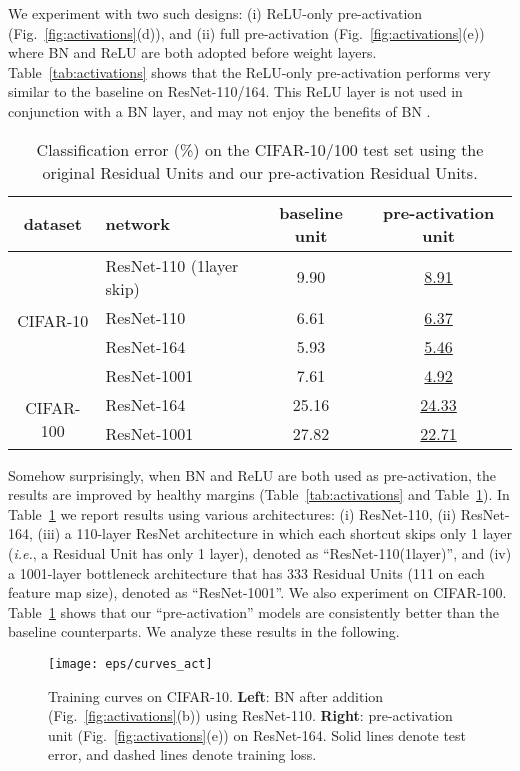 \documentclass[runningheads]{llncs}
\def\ie{\emph{i.e.}}
\begin{document}
We experiment with two such designs: (i) ReLU-only pre-activation (Fig.~\ref{fig:activations}(d)), and (ii) full pre-activation (Fig.~\ref{fig:activations}(e)) where BN and ReLU are both adopted before weight layers. Table~\ref{tab:activations} shows that the ReLU-only pre-activation performs very similar to the baseline on ResNet-110/164. This ReLU layer is not used in conjunction with a BN layer, and may not enjoy the benefits of BN \cite{Ioffe2015}.


\renewcommand\arraystretch{1.3}
\setlength{\tabcolsep}{4pt}
\begin{table}[t]
\caption{Classification error (\%) on the CIFAR-10/100 test set using the original Residual Units and our pre-activation Residual Units.}\label{tab:preact}
\centering
\fontsize{8pt}{1em}\selectfont
\begin{tabular}{c|l|c|c}
\hline
dataset & network & baseline unit & pre-activation unit \\
\hline
\multirow{4}{*}{CIFAR-10}
& ResNet-110 (1layer skip) & 9.90 & \underline{8.91}\\
& ResNet-110 & 6.61 & \underline{6.37}\\
& ResNet-164 & 5.93 & \underline{5.46}\\
& ResNet-1001 & 7.61 & \underline{4.92}\\
\hline
\multirow{2}{*}{CIFAR-100}
& ResNet-164 & 25.16 & \underline{24.33}\\
& ResNet-1001 & 27.82  & \underline{22.71}\\
\hline
\end{tabular}
\end{table}

Somehow surprisingly, when BN and ReLU are both used as pre-activation, the results are improved by healthy margins (Table~\ref{tab:activations} and Table~\ref{tab:preact}). In Table~\ref{tab:preact} we report results using various architectures: (i) ResNet-110, (ii) ResNet-164, (iii) a 110-layer ResNet architecture in which each shortcut skips only 1 layer (\ie, a Residual Unit has only 1 layer), denoted as ``ResNet-110(1layer)'', and (iv) a 1001-layer bottleneck architecture that has 333 Residual Units (111 on each feature map size), denoted as ``ResNet-1001''. We also experiment on CIFAR-100. Table~\ref{tab:preact} shows that our ``pre-activation'' models are consistently better than the baseline counterparts. We analyze these results in the following.

\begin{figure}[t]
\centering
\texttt{[image: eps/curves\_act]}
\caption{Training curves on CIFAR-10. \textbf{Left}: BN after addition (Fig.~\ref{fig:activations}(b)) using ResNet-110. \textbf{Right}: pre-activation unit (Fig.~\ref{fig:activations}(e)) on ResNet-164. Solid lines denote test error, and dashed lines denote training loss.
}
\label{fig:curves_act}
\end{figure}
\end{document}
